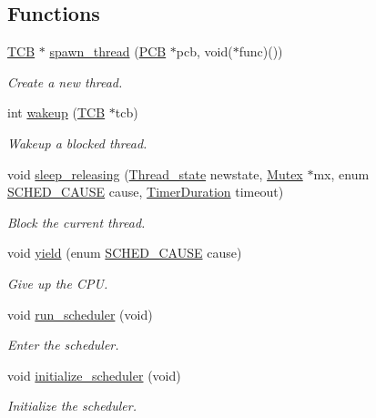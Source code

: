 \subsection*{Functions}
\begin{DoxyCompactItemize}
\item 
\hyperlink{group__scheduler_gaf88d9c946bf70b36a1e8bc34383abfc9}{T\+CB} $\ast$ \hyperlink{group__scheduler_ga34517ad777ad754965f80fe0248c16e5}{spawn\+\_\+thread} (\hyperlink{group__proc_gadf327f09ee935cf1734c14e8849f0421}{P\+CB} $\ast$pcb, void($\ast$func)())
\begin{DoxyCompactList}\small\item\em Create a new thread. \end{DoxyCompactList}\item 
int \hyperlink{group__scheduler_gae8301452fd9ae5bf7cd7f2676650ff06}{wakeup} (\hyperlink{group__scheduler_gaf88d9c946bf70b36a1e8bc34383abfc9}{T\+CB} $\ast$tcb)
\begin{DoxyCompactList}\small\item\em Wakeup a blocked thread. \end{DoxyCompactList}\item 
void \hyperlink{group__scheduler_ga0ab1a2dcfbfe3fb09cc24044efddfd34}{sleep\+\_\+releasing} (\hyperlink{group__scheduler_ga6c969c169777f82c104cf73e501df70f}{Thread\+\_\+state} newstate, \hyperlink{group__syscalls_gaef2ec62cae8e0031fd19fc8b91083ade}{Mutex} $\ast$mx, enum \hyperlink{group__scheduler_gaad787d8d80312ffca3c0f197b3a25fbe}{S\+C\+H\+E\+D\+\_\+\+C\+A\+U\+SE} cause, \hyperlink{bios_8h_ae7291e5cd742fb9bc6d4aaa0d51bd0ee}{Timer\+Duration} timeout)
\begin{DoxyCompactList}\small\item\em Block the current thread. \end{DoxyCompactList}\item 
void \hyperlink{group__scheduler_ga1db327892199949812ae5a52119f2e97}{yield} (enum \hyperlink{group__scheduler_gaad787d8d80312ffca3c0f197b3a25fbe}{S\+C\+H\+E\+D\+\_\+\+C\+A\+U\+SE} cause)
\begin{DoxyCompactList}\small\item\em Give up the C\+PU. \end{DoxyCompactList}\item 
void \hyperlink{group__scheduler_ga147600b59d656eb9d9558673c2fad36d}{run\+\_\+scheduler} (void)
\begin{DoxyCompactList}\small\item\em Enter the scheduler. \end{DoxyCompactList}\item 
void \hyperlink{group__scheduler_ga244fb594301322e79d11a7844c759bba}{initialize\+\_\+scheduler} (void)
\begin{DoxyCompactList}\small\item\em Initialize the scheduler. \end{DoxyCompactList}\end{DoxyCompactItemize}
